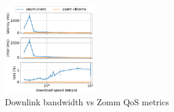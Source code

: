 \begin{figure}[]
    \includegraphics[width=0.35\textwidth,keepaspectratio]{figures/static/downlink_qos_zoom.pdf}
    \caption{Downlink bandwidth vs Zomm QoS metrics}
    \label{fig:downlink_qos_zoom}
\end{figure}

